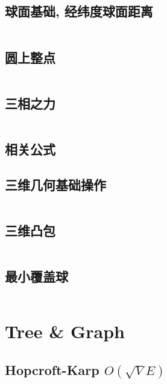 \documentclass[titlepage, a4paper]{article}
\begin{document}
\begin{multicols}{2}
\begin{spacing}{0.6}
				\subsection{球面基础, 经纬度球面距离}
				\begin{small}
					
				\end{small}
					\inputminted{cpp}{src/Geometry/经纬度求球面最短距离.cpp}
				\subsection{圆上整点}
					\inputminted{cpp}{src/Geometry/圆上整点.cpp}
				\subsection{三相之力}
				\inputminted{cpp}{src/Geometry/三角形.cpp}
				\subsection{相关公式}
					
				\subsection{三维几何基础操作}
					\inputminted{cpp}{src/Geometry/三维几何.cpp}
				\subsection{三维凸包}
					\inputminted{cpp}{src/Geometry/三维凸包.cpp}
				\subsection{最小覆盖球}
					\inputminted{cpp}{src/Geometry/最小覆盖球.cpp}
					
			\section{Tree \& Graph}
				\subsection{Hopcroft-Karp $O(\sqrt{V} E)$}
					\inputminted[highlightlines={5,9}]{cpp}{src/TreeandGraph/hk_skip2004.cpp}

\end{spacing}
\end{multicols}
\end{document}
